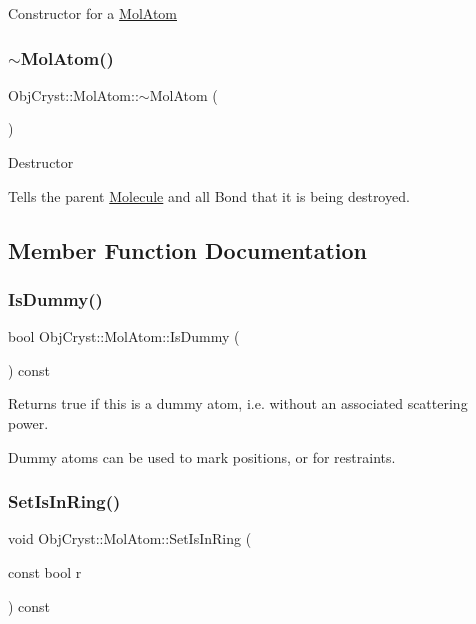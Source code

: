 Constructor for a \mbox{\hyperlink{class_obj_cryst_1_1_mol_atom}{Mol\+Atom}} \mbox{\label{class_obj_cryst_1_1_mol_atom_a01d5507db6c5c841af3061af70e3161b}} 
\subsubsection{\texorpdfstring{$\sim$MolAtom()}{~MolAtom()}}
{\footnotesize\ttfamily Obj\+Cryst\+::\+Mol\+Atom\+::$\sim$\+Mol\+Atom (\begin{DoxyParamCaption}{ }\end{DoxyParamCaption})\hspace{0.3cm}{\ttfamily [virtual]}}

Destructor

Tells the parent \mbox{\hyperlink{class_obj_cryst_1_1_molecule}{Molecule}} and all Bond that it is being destroyed. 

\subsection{Member Function Documentation}
\mbox{\label{class_obj_cryst_1_1_mol_atom_a7a9d47a67d585dd4e7f699ab481ad2c3}} 
\subsubsection{\texorpdfstring{IsDummy()}{IsDummy()}}
{\footnotesize\ttfamily bool Obj\+Cryst\+::\+Mol\+Atom\+::\+Is\+Dummy (\begin{DoxyParamCaption}{ }\end{DoxyParamCaption}) const}

Returns true if this is a dummy atom, i.\+e. without an associated scattering power.

Dummy atoms can be used to mark positions, or for restraints. \mbox{\label{class_obj_cryst_1_1_mol_atom_af9ee83ee7c3b03b1cd5adaad642799e3}} 
\subsubsection{\texorpdfstring{SetIsInRing()}{SetIsInRing()}}
{\footnotesize\ttfamily void Obj\+Cryst\+::\+Mol\+Atom\+::\+Set\+Is\+In\+Ring (\begin{DoxyParamCaption}\item[{const bool}]{r }\end{DoxyParamCaption}) const}


